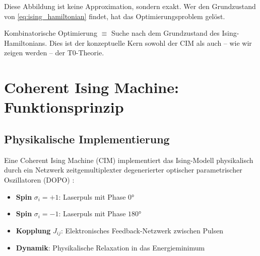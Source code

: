 \begin{table}[h]
    \centering
    \caption{Beispiele für die Abbildung NP-harter Probleme auf Ising-Hamiltonians}
    \label{tab:qubo_examples}
\end{table}

Diese Abbildung ist keine Approximation, sondern exakt. Wer den Grundzustand von 
\eqref{eq:ising_hamiltonian} findet, hat das Optimierungsproblem gelöst.

\begin{important}
    Kombinatorische Optimierung $\equiv$ Suche nach dem Grundzustand des Ising-Hamiltonians. 
    Dies ist der konzeptuelle Kern sowohl der CIM als auch -- wie wir zeigen werden -- 
    der T0-Theorie.
\end{important}

\clearpage

\section{Coherent Ising Machine: Funktionsprinzip}
\label{sec:cim}

\subsection{Physikalische Implementierung}

Eine Coherent Ising Machine (CIM) implementiert das Ising-Modell physikalisch durch 
ein Netzwerk zeitgemultiplexter degenerierter optischer parametrischer Oszillatoren 
(DOPO) \cite{yamamoto_cim_2017, honjo_100k_cim_2021}:

\begin{itemize}
    \item \textbf{Spin} $\sigma_i = +1$: Laserpuls mit Phase $0°$
    \item \textbf{Spin} $\sigma_i = -1$: Laserpuls mit Phase $180°$
    \item \textbf{Kopplung} $J_{ij}$: Elektronisches Feedback-Netzwerk zwischen Pulsen
    \item \textbf{Dynamik}: Physikalische Relaxation in das Energieminimum
\end{itemize}

